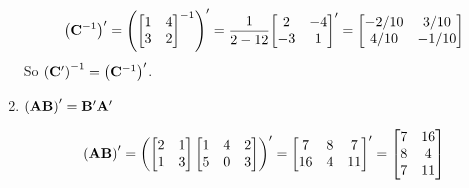 \begin{enumerate}[label=(\alph*)]
            \[
                {\left(\bold{C}^{-1}\right)}^\prime =
                {\left(
                    {\begin{bmatrix}
                        1 & 4 \\
                        3 & 2
                    \end{bmatrix}}^{-1}\right)
                }^\prime =
                {\frac{1}{2-12}
                {\begin{bmatrix}
                    2 & -4 \\
                    -3 & 1
                \end{bmatrix}}
                }^\prime =
                \begin{bmatrix}
                    -2/10 & 3/10 \\
                    4/10 & -1/10
                \end{bmatrix}
            \]
            So ${\left(\bold{C}^\prime\right)}^{-1} = {\left(\bold{C}^{-1}\right)}^\prime$.

            \item ${\left(\bold{AB}\right)}^\prime = \bold{B}^\prime \bold{A}^\prime$
            
            \[
                {\left(\bold{AB}\right)}^\prime = 
                {\left(
                    \begin{bmatrix}
                        2 & 1 \\
                        1 & 3
                    \end{bmatrix}
                    \begin{bmatrix}
                        1 & 4 & 2 \\
                        5 & 0 & 3
                    \end{bmatrix}
                \right)}^\prime =
                {\begin{bmatrix}
                    7 & 8 & 7 \\
                    16 & 4 & 11
                \end{bmatrix}}^\prime =
                \begin{bmatrix}
                    7 & 16 \\
                    8 & 4 \\
                    7 & 11
                \end{bmatrix}
            \]


\end{enumerate}
